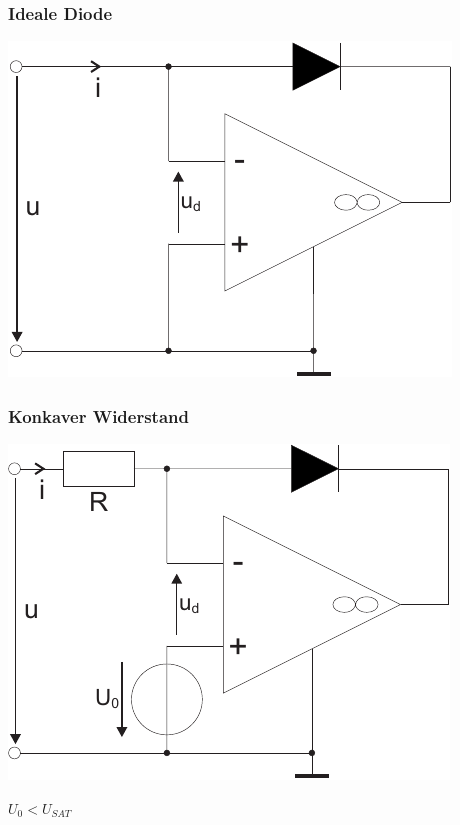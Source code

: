 \documentclass[a4paper,twocolumn,10pt]{article}
\begin{document}
\subsubsection*{Ideale Diode}
\begin{minipage}[b]{0.25\textwidth}
\includegraphics[width=\textwidth]{Grafiken/OP_IdealeDiode}
\end{minipage}

\subsubsection*{Konkaver Widerstand}
\begin{minipage}[b]{0.25\textwidth}
\includegraphics[width=\textwidth]{Grafiken/OP_Rkonkav}
\end{minipage}
\hfill
\begin{minipage}[b]{0.2\textwidth}
$U_0<U_{SAT}$\\\\
\end{minipage}
\end{document}

